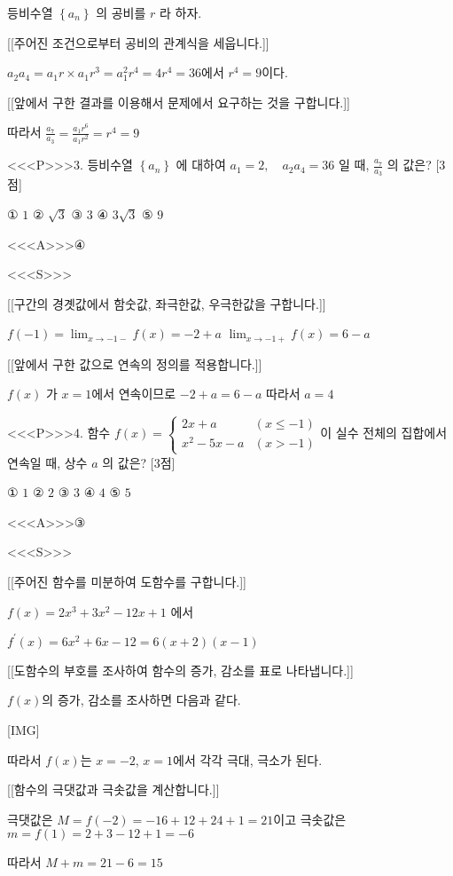 \documentclass{oblivoir}
\begin{document}
등비수열 $\left\{a_{n}\right\}$ 의 공비를 $r$ 라 하자.

[[주어진 조건으로부터 공비의 관계식을 세웁니다.]]

$a_{2} a_{4}=a_{1} r \times a_{1} r^{3}=a_{1}^{2} r^{4}=4 r^{4}=36$에서 $r^{4}=9$이다.

[[앞에서 구한 결과를 이용해서 문제에서 요구하는 것을 구합니다.]]

따라서 $\frac{a_{7}}{a_{3}}=\frac{a_{1} r^{6}}{a_{1} r^{2}}=r^{4}=9$


<<<P>>>3. 등비수열 $\left\{a_{n}\right\}$ 에 대하여 $a_{1}=2, \quad a_{2} a_{4}=36$ 일 때, $\frac{a_{7}}{a_{3}}$ 의 값은? [3점]

① $1$
② $\sqrt{3}$
③ $3$
④ $3 \sqrt{3}$
⑤ $9$

<<<A>>>④

<<<S>>>

[[구간의 경곗값에서 함숫값, 좌극한값, 우극한값을 구합니다.]]

$ f(-1)=\lim _{x \rightarrow-1-} f(x)=-2+a$
$\lim _{x \rightarrow-1+} f(x)=6-a$

[[앞에서 구한 값으로 연속의 정의를 적용합니다.]]

$f(x)$ 가 $x=1$에서 연속이므로 $-2+a=6-a$
따라서 $a=4$


<<<P>>>4. 함수 $f(x)= \begin{cases}2 x+a & (x \leq-1) \\ x^{2}-5 x-a & (x>-1)\end{cases}$이 실수 전체의 집합에서 연속일 때, 상수 $a$ 의 값은? [3점]

① $1$
② $2$
③ $3$
④ $4$
⑤ $5$


<<<A>>>③

<<<S>>>

[[주어진 함수를 미분하여 도함수를 구합니다.]]

$f(x)=2 x^{3}+3 x^{2}-12 x+1$ 에서

$f^{\prime}(x)=6 x^{2}+6 x-12=6(x+2)(x-1)$

[[도함수의 부호를 조사하여 함수의 증가, 감소를 표로 나타냅니다.]]

$f(x)$의 증가, 감소를 조사하면 다음과 같다.

[IMG]

따라서 $f(x)$는 $x=-2$, $x=1$에서 각각 극대, 극소가 된다.

[[함수의 극댓값과 극솟값을 계산합니다.]]

극댓값은 $M=f(-2)=-16+12+24+1=21$이고
극솟값은 $m=f(1)=2+3-12+1=-6$

따라서 $M+m=21-6=15$
\end{document}
